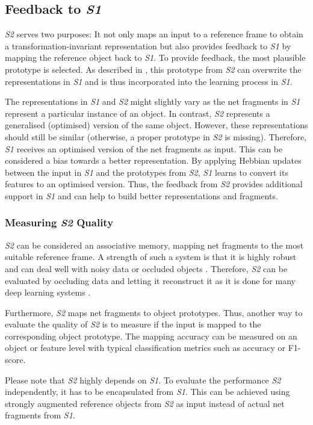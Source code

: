 \subsection{Feedback to \emph{S1}}
\emph{S2} serves two purposes: It not only maps an input to a reference frame to obtain a transformation-invariant representation but also provides feedback to \emph{S1} by mapping the reference object back to \emph{S1}.
To provide feedback, the most plausible prototype is selected.
As described in , this prototype from \emph{S2} can overwrite the representations in \emph{S1} and is thus incorporated into the learning process in \emph{S1}.

The representations in \emph{S1} and \emph{S2} might slightly vary as the net fragments in \emph{S1} represent a particular instance of an object. In contrast, \emph{S2} represents a generalised (optimised) version of the same object.
However, these representations should still be similar (otherwise, a proper prototype in \emph{S2} is missing).
Therefore, \emph{S1} receives an optimised version of the net fragments as input. This can be considered a bias towards a better representation.
By applying Hebbian updates between the input in \emph{S1} and the prototypes from \emph{S2}, \emph{S1} learns to convert its features to an optimised version.
Thus, the feedback from \emph{S2} provides additional support in \emph{S1} and can help to build better representations and fragments.


\subsubsection{Measuring \emph{S2} Quality}
\emph{S2} can be considered an associative memory, mapping net fragments to the most suitable reference frame.
A strength of such a system is that it is highly robust and can deal well with noisy data or occluded objects .
Therefore, \emph{S2} can be evaluated by occluding data and letting it reconstruct it as it is done for many deep learning systems . 

Furthermore, \emph{S2} maps net fragments to object prototypes. Thus, another way to evaluate the quality of \emph{S2} is to measure if the input is mapped to the corresponding object prototype.
The mapping accuracy can be measured on an object or feature level with typical classification metrics  such as accuracy or F1-score.

Please note that \emph{S2} highly depends on \emph{S1}. To evaluate the performance \emph{S2} independently, it has to be encapsulated from \emph{S1}.
This can be achieved using strongly augmented reference objects from \emph{S2} as input instead of actual net fragments from \emph{S1}.
